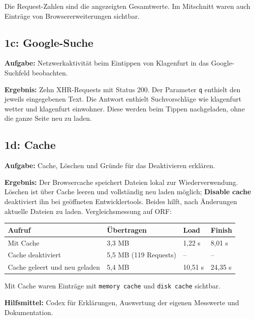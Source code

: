 \documentclass[10pt,a4paper]{article}
\begin{document}
{\small Die Request-Zahlen sind die angezeigten Gesamtwerte.
Im Mitschnitt waren auch Einträge von Browsererweiterungen sichtbar.}

\subsection*{1c: Google-Suche}
\textbf{Aufgabe:} Netzwerkaktivität beim Eintippen von
\glqq Klagenfurt\grqq{} in das Google-Suchfeld beobachten.

\textbf{Ergebnis:} Zehn XHR-Requests mit Status 200.
Der Parameter \texttt{q} enthielt
den jeweils eingegebenen Text. Die Antwort enthielt Suchvorschläge wie
\glqq klagenfurt wetter\grqq{} und \glqq klagenfurt einwohner\grqq.
Diese werden beim Tippen nachgeladen, ohne die ganze Seite neu zu laden.

\subsection*{1d: Cache}
\textbf{Aufgabe:} Cache, Löschen und Gründe für das Deaktivieren erklären.

\textbf{Ergebnis:} Der Browsercache speichert Dateien lokal zur
Wiederverwendung. Löschen ist über \glqq Cache leeren und vollständig
neu laden\grqq{} möglich; \textbf{Disable cache} deaktiviert ihn bei
geöffneten Entwicklertools. Beides hilft, nach Änderungen aktuelle Dateien
zu laden. Vergleichsmessung auf ORF:

\begin{center}
\begin{tabular}{|l|l|l|l|}
\hline
\textbf{Aufruf} & \textbf{Übertragen} & \textbf{Load} & \textbf{Finish} \\ \hline
Mit Cache & 3,3 MB & 1,22 s & 8,01 s \\ \hline
Cache deaktiviert & 5,5 MB (119 Requests) & -- & -- \\ \hline
Cache geleert und neu geladen & 5,4 MB & 10,51 s & 24,35 s \\ \hline
\end{tabular}
\end{center}

Mit Cache waren Einträge mit \texttt{memory cache} und
\texttt{disk cache} sichtbar.

\medskip
{\small \textbf{Hilfsmittel:} Codex für Erklärungen, Auswertung der eigenen Messwerte und Dokumentation.}
\end{document}
